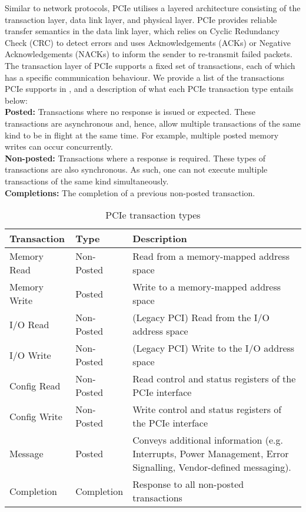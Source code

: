 Similar to network protocols, PCIe utilises a layered architecture consisting of the transaction layer, data link layer, and physical layer.
PCIe provides reliable transfer semantics in the data link layer, which relies on Cyclic Redundancy Check (CRC) to detect errors and uses Acknowledgements (ACKs) or Negative Acknowledgements (NACKs) to inform the sender to re-transmit failed packets.
The transaction layer of PCIe supports a fixed set of transactions, each of which has a specific communication behaviour.
We provide a list of the transactions PCIe supports in , and a description of what each PCIe transaction type entails below: \\
\textbf{Posted:} Transactions where no response is issued or expected. 
These transactions are asynchronous and, hence, allow multiple transactions of the same kind to be in flight at the same time.
For example, multiple posted memory writes can occur concurrently. \\
\textbf{Non-posted:} Transactions where a response is required. 
These types of transactions are also synchronous.
As such, one can not execute multiple transactions of the same kind simultaneously.\\
\textbf{Completions:} The completion of a previous non-posted transaction.\\

\begin{table}[htb]
    \centering
    \begin{tabular}{|l|l|p{}|}
        \hline
        \textbf{Transaction} & \textbf{Type} & \textbf{Description} \\ 
        \hline
        Memory Read  & Non-Posted & Read from a memory-mapped address space \\ 
        Memory Write & Posted     & Write to a memory-mapped address space  \\ 
        I/O Read     & Non-Posted & (Legacy PCI) Read from the I/O address space \\ 
        I/O Write    & Non-Posted & (Legacy PCI) Write to the I/O address space \\ 
        Config Read  & Non-Posted & Read control and status registers of the PCIe interface \\ 
        Config Write & Non-Posted & Write control and status registers of the PCIe interface \\  
        Message      & Posted     & Conveys additional information (e.g. Interrupts, Power Management, Error Signalling, Vendor-defined messaging). \\
        Completion   & Completion & Response to all non-posted transactions \\ 
        \hline
    \end{tabular}
    \caption{PCIe transaction types}
    \label{tab:pcie-transaction-types}
\end{table}